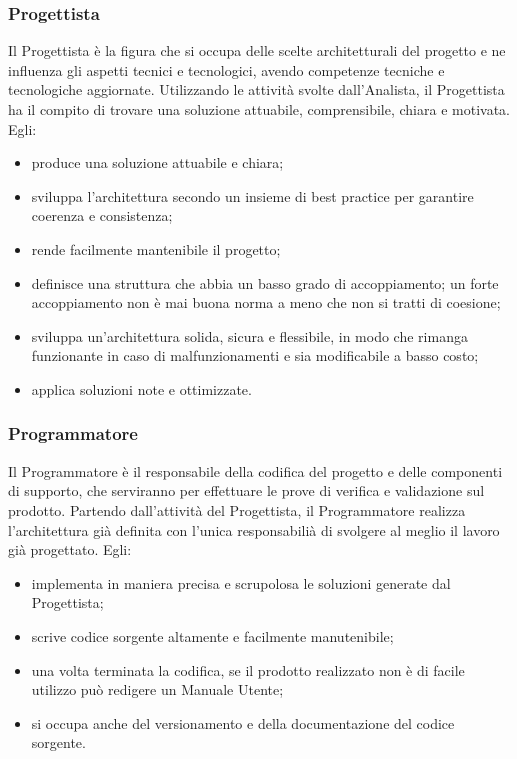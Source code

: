 \subsubsection{Progettista}
Il Progettista è la figura che si occupa delle scelte architetturali del progetto e ne influenza gli aspetti tecnici e tecnologici, avendo competenze tecniche e tecnologiche aggiornate.
Utilizzando le attività svolte dall'Analista, il Progettista ha il compito di trovare una soluzione attuabile, comprensibile, chiara e motivata.
Egli:
\begin{itemize}
\item{produce una soluzione attuabile e chiara;}
\item{sviluppa l’architettura secondo un insieme di best practice per garantire coerenza e consistenza;}
\item{rende facilmente mantenibile il progetto;}
\item{definisce una struttura che abbia un basso grado di accoppiamento; un forte accoppiamento non è mai buona norma a meno che non si tratti di coesione;}
\item{sviluppa un’architettura solida,  sicura  e  flessibile, in modo  che rimanga funzionante in caso di malfunzionamenti e sia modificabile a basso costo;}
\item{applica soluzioni note e ottimizzate.}
\end{itemize}

\subsubsection{Programmatore}
Il Programmatore è il responsabile della codifica del progetto e delle componenti di supporto, che serviranno per effettuare le prove di verifica e validazione sul prodotto.
Partendo dall’attività del Progettista, il Programmatore realizza l’architettura già definita con l’unica responsabilià di svolgere al meglio il lavoro già progettato.
Egli:
\begin{itemize}
\item{implementa in maniera precisa e scrupolosa le soluzioni generate dal Progettista;}
\item{scrive codice sorgente altamente e facilmente manutenibile;}
\item{una volta terminata la codifica, se il prodotto realizzato non è di facile utilizzo può redigere un Manuale Utente;}
\item{si occupa anche del versionamento e della documentazione del codice sorgente.}
\end{itemize}

